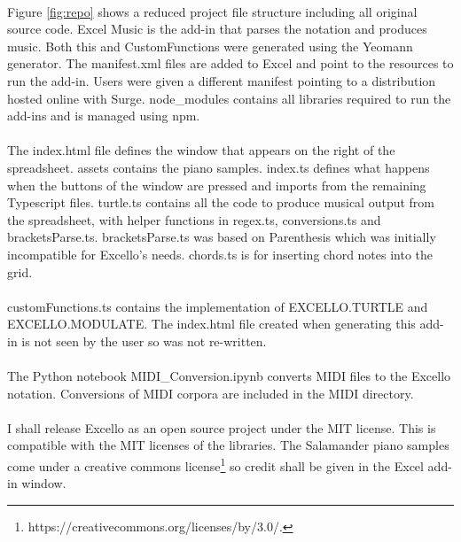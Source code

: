 \paragraph{} Figure \ref{fig:repo} shows a reduced project file structure including all original source code. Excel Music is the add-in that parses the notation and produces music. Both this and CustomFunctions were generated using the Yeomann generator. The manifest.xml files are added to Excel and point to the resources to run the add-in. Users were given a different manifest pointing to a distribution hosted online with Surge. node\_modules contains all libraries required to run the add-ins and is managed using npm.

\paragraph{} The index.html file defines the window that appears on the right of the spreadsheet. assets contains the piano samples. index.ts defines what happens when the buttons of the window are pressed and imports from the remaining Typescript files. turtle.ts contains all the code to produce musical output from the spreadsheet, with helper functions in regex.ts, conversions.ts and bracketsParse.ts. bracketsParse.ts was based on Parenthesis which was initially incompatible for Excello's needs. chords.ts is for inserting chord notes into the grid.

\paragraph{} customFunctions.ts contains the implementation of EXCELLO.TURTLE and EXCELLO.MODULATE. The index.html file created when generating this add-in is not seen by the user so was not re-written.

\paragraph{} The Python notebook MIDI\_Conversion.ipynb converts MIDI files to the Excello notation. Conversions of MIDI corpora are included in the MIDI directory.

\paragraph{} I shall release Excello as an open source project under the MIT license. This is compatible with the MIT licenses of the libraries. The Salamander piano samples come under a creative commons license\footnote{https://creativecommons.org/licenses/by/3.0/.} so credit shall be given in the Excel add-in window.
